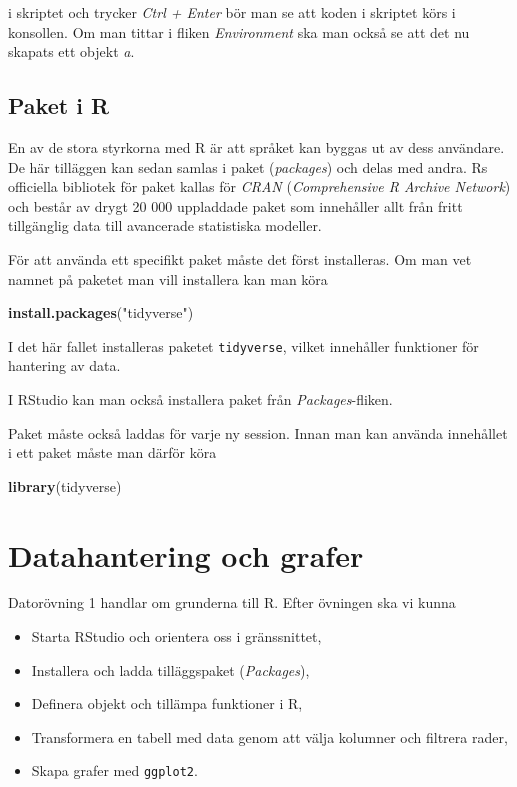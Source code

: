 \documentclass[
]{book}
\newenvironment{Shaded}{\begin{snugshade}}{\end{snugshade}}
\newcommand{\FunctionTok}[1]{\textcolor[rgb]{0.13,0.29,0.53}{\textbf{#1}}}
\newcommand{\NormalTok}[1]{#1}
\newcommand{\StringTok}[1]{\textcolor[rgb]{0.31,0.60,0.02}{#1}}
\providecommand{\tightlist}{%
  \setlength{\itemsep}{0pt}\setlength{\parskip}{0pt}}
\theoremstyle{definition}
\theoremstyle{definition}
\theoremstyle{definition}
\theoremstyle{definition}
\theoremstyle{remark}
\begin{document}
i skriptet och trycker \emph{Ctrl + Enter} bör man se att koden i skriptet körs i konsollen. Om man tittar i fliken \emph{Environment} ska man också se att det nu skapats ett objekt \emph{a}.

\section{Paket i R}\label{paket-i-r}

En av de stora styrkorna med R är att språket kan byggas ut av dess användare. De här tilläggen kan sedan samlas i paket (\emph{packages}) och delas med andra. Rs officiella bibliotek för paket kallas för \emph{CRAN} (\emph{Comprehensive R Archive Network}) och består av drygt 20 000 uppladdade paket som innehåller allt från fritt tillgänglig data till avancerade statistiska modeller.

För att använda ett specifikt paket måste det först installeras. Om man vet namnet på paketet man vill installera kan man köra

\begin{Shaded}
\begin{Highlighting}[]
\FunctionTok{install.packages}\NormalTok{(}\StringTok{"tidyverse"}\NormalTok{)}
\end{Highlighting}
\end{Shaded}

I det här fallet installeras paketet \texttt{tidyverse}, vilket innehåller funktioner för hantering av data.

I RStudio kan man också installera paket från \emph{Packages}-fliken.

Paket måste också laddas för varje ny session. Innan man kan använda innehållet i ett paket måste man därför köra

\begin{Shaded}
\begin{Highlighting}[]
\FunctionTok{library}\NormalTok{(tidyverse)}
\end{Highlighting}
\end{Shaded}

\chapter{Datahantering och grafer}\label{datahantering-och-grafer}

Datorövning 1 handlar om grunderna till R. Efter övningen ska vi kunna

\begin{itemize}
\tightlist
\item
  Starta RStudio och orientera oss i gränssnittet,
\item
  Installera och ladda tilläggspaket (\emph{Packages}),
\item
  Definera objekt och tillämpa funktioner i R,
\item
  Transformera en tabell med data genom att välja kolumner och filtrera rader,
\item
  Skapa grafer med \texttt{ggplot2}.
\end{itemize}
\end{document}
